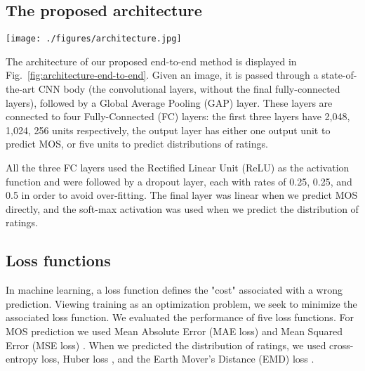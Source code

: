 \documentclass[10pt,journal,compsoc]{IEEEtran}
\begin{document}
\subsection{The proposed architecture}

\begin{figure*}[!t]
\centering
\texttt{[image: ./figures/architecture.jpg]}
\caption{Architecture of the end-to-end system. We test two types of training, one predicting the MOS values and the other predicting the distribution of ratings.}
\label{fig:architecture-end-to-end}
\vspace{-10pt}
\end{figure*}



The architecture of our proposed end-to-end method is displayed in Fig.~\ref{fig:architecture-end-to-end}. Given an image, it is passed through a state-of-the-art CNN body (the convolutional layers, without the final fully-connected layers), followed by a Global Average Pooling (GAP) layer. These layers are connected to four Fully-Connected (FC) layers: the first three layers have 2,048, 1,024, 256 units respectively, the output layer has either one output unit to predict MOS, or five units to predict distributions of ratings.

All the three FC layers used the Rectified Linear Unit (ReLU) as the activation function and were followed by a dropout layer, each with rates of 0.25, 0.25, and 0.5 in order to avoid over-fitting. The final layer was linear when we predict MOS directly, and the soft-max activation was used when we predict the distribution of ratings. 




 
 

\subsection{Loss functions}
\label{subsec:loss}
In machine learning, a loss function defines the "cost" associated with a wrong prediction. Viewing training as an optimization problem, we seek to minimize the associated loss function. We evaluated the performance of five loss functions. For MOS prediction we used Mean Absolute Error (MAE loss) \cite{conv1,boss} and Mean Squared Error (MSE loss) \cite{li2016no}. When we predicted the distribution of ratings, we used cross-entropy loss, Huber loss \cite{hubertus}, and the Earth Mover's Distance (EMD) loss \cite{rubner2000earth}.
\end{document}
